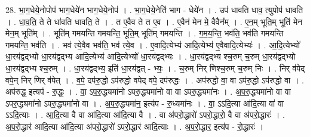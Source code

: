\documentclass[17pt]{extarticle}
\begin{document}
28. भा॒ग॒धेये॒नोपोप॑ भाग॒धेये॑न भाग॒धेये॒नोप॑ । . भा॒ग॒धेये॒नेति॑ भाग - धेये॑न । . उप॑ धावति धाव॒ त्युपोप॑ धावति । . धा॒व॒ति॒ ते ते धा॑वति धावति॒ ते । . त ए॒वैव ते त ए॒व । . ए॒वैन॑ मेन मे॒ वैवैन᳚म् । . ए॒न॒म् भूति॒म् भूति॑ मेन मेन॒म् भूति᳚म् । . भूति॑म् गमयन्ति गमयन्ति॒ भूति॒म् भूति॑म् गमयन्ति । . ग॒म॒य॒न्ति॒ भव॑ति॒ भव॑ति गमयन्ति गमयन्ति॒ भव॑ति । . भव॑ त्ये॒वैव भव॑ति॒ भव॑ त्ये॒व । . ए॒वादि॒त्येभ्य॑ आदि॒त्येभ्य॑ ए॒वैवादि॒त्येभ्यः॑ । . आ॒दि॒त्येभ्यो॑ धा॒रय॑द्वद्भ्यो धा॒रय॑द्वद्भ्य आदि॒त्येभ्य॑ आदि॒त्येभ्यो॑ धा॒रय॑द्वद्भ्यः । . धा॒रय॑द्वद्भ्य श्च॒रुम् च॒रुम् धा॒रय॑द्वद्भ्यो धा॒रय॑द्वद्भ्य श्च॒रुम् । . धा॒रय॑द्वद्भ्य॒ इति॑ धा॒रय॑द्वत् - भ्यः॒ । . च॒रुम् निर् णिश्च॒रुम् च॒रुम् निः । . निर् व॑पेद् वपे॒न् निर् णिर् व॑पेत् । . व॒पे॒ दप॑रु॒द्धो ऽप॑रुद्धो वपेद् वपे॒ दप॑रुद्धः । . अप॑रुद्धो वा॒ वा ऽप॑रु॒द्धो ऽप॑रुद्धो वा । . अप॑रुद्ध॒ इत्यप॑ - रु॒द्धः॒ । . वा॒ ऽप॒रु॒द्ध्यमा॑नो ऽपरु॒द्ध्यमा॑नो वा वा ऽपरु॒द्ध्यमा॑नः । . अ॒प॒रु॒द्ध्यमा॑नो वा वा ऽपरु॒द्ध्यमा॑नो ऽपरु॒द्ध्यमा॑नो वा । . अ॒प॒रु॒द्ध्यमा॑न॒ इत्य॑प - रु॒ध्यमा॑नः । . वा॒ ऽऽदि॒त्या आ॑दि॒त्या वा॑ वा ऽऽदि॒त्याः । . आ॒दि॒त्या वै वा आ॑दि॒त्या आ॑दि॒त्या वै । . वा अ॑परो॒द्धारो॑ ऽपरो॒द्धारो॒ वै वा अ॑परो॒द्धारः॑ । . अ॒प॒रो॒द्धार॑ आदि॒त्या आ॑दि॒त्या अ॑परो॒द्धारो॑ ऽपरो॒द्धार॑ आदि॒त्याः । . अ॒प॒रो॒द्धार॒ इत्य॑प - रो॒द्धारः॑ । \newline
\end{document}
